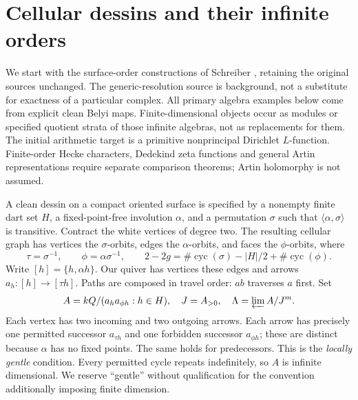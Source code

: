 \documentclass[11pt]{article}
\theoremstyle{definition}\newtheorem{definition}[theorem]{Definition}
\theoremstyle{remark}\newtheorem{remark}[theorem]{Remark}
\begin{document}
\section{Cellular dessins and their infinite orders}
We start with the surface-order constructions of Schreiber \cite{SurfaceOrders,SurfaceDuality}, retaining the original sources unchanged. The generic-resolution source \cite{Persistence} is background, not a substitute for exactness of a particular complex. All primary algebra examples below come from explicit clean Belyi maps. Finite-dimensional objects occur as modules or specified quotient strata of those infinite algebras, not as replacements for them. The initial arithmetic target is a primitive nonprincipal Dirichlet $L$-function. Finite-order Hecke characters, Dedekind zeta functions and general Artin representations require separate comparison theorems; Artin holomorphy is not assumed.

A clean dessin on a compact oriented surface is specified by a nonempty finite dart set $H$, a fixed-point-free involution $\alpha$, and a permutation $\sigma$ such that $\langle\alpha,\sigma\rangle$ is transitive. Contract the white vertices of degree two. The resulting cellular graph has vertices the $\sigma$-orbits, edges the $\alpha$-orbits, and faces the $\phi$-orbits, where
\[
 \tau=\sigma^{-1},\qquad \phi=\alpha\sigma^{-1},\qquad
 2-2g=\#\operatorname{cyc}(\sigma)-|H|/2+\#\operatorname{cyc}(\phi).
\]
Write $[h]=\{h,\alpha h\}$. Our quiver has vertices these edges and arrows $a_h:[h]\to[\tau h]$. Paths are composed in travel order: $ab$ traverses $a$ first. Set
\[
 A=kQ/(a_h a_{\phi h}:h\in H),\quad J=A_{>0},\quad
 \Lambda=\varprojlim A/J^m.
\]
Each vertex has two incoming and two outgoing arrows. Each arrow has precisely one permitted successor $a_{\tau h}$ and one forbidden successor $a_{\phi h}$; these are distinct because $\alpha$ has no fixed points. The same holds for predecessors. This is the \emph{locally gentle} condition. Every permitted cycle repeats indefinitely, so $A$ is infinite dimensional. We reserve ``gentle'' without qualification for the convention additionally imposing finite dimension.
\end{document}
